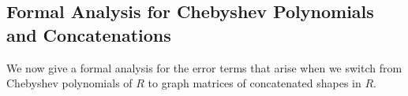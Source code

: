 \documentclass[12pt]{article}
\newcommand{\Var}{\mathrm{Var}}
\newtheorem{proposition}[theorem]{Proposition}
\newtheorem{definition}[theorem]{Definition}
\newcommand{\calB}{\mathcal{B}}
\newcommand{\cm}{\mathsf{M} }
\newcommand{\bti}{\mathsf{BacktrackingInt}}
\newcommand{\todo}[1]{\textcolor{red}{(#1)}}
\begin{document}






\subsection{Formal Analysis for Chebyshev Polynomials and Concatenations}
We now give a formal analysis for the error terms that arise when we switch from Chebyshev polynomials of $R$ to graph matrices of concatenated shapes in $R$.

\label{sec:chebyshev-Q}
\end{document}
